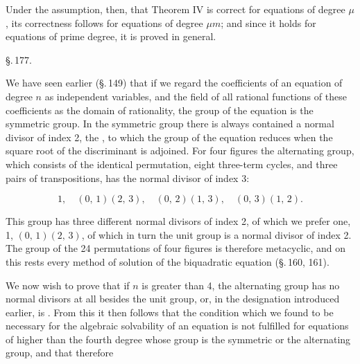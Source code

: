 
Under the assumption, then, that Theorem IV is correct for equations of degree $\mu$, its correctness follows for equations of degree $\mu m$; and since it holds for equations of prime degree, it is proved in general.

\begin{center}
\S.\,177.

\end{center}

We have seen earlier (\S.\,149) that if we regard the coefficients of an equation of degree $n$ as independent variables, and the field of all rational functions of these coefficients as the domain of rationality, the  group of the equation is the symmetric group. In the symmetric group there is always contained a normal divisor of index 2, the , to which the group of the equation reduces when the square root of the discriminant is adjoined. For four figures the alternating group, which consists of the identical permutation, eight three-term cycles, and three pairs of transpositions, has the normal divisor of index 3:

\[
1, \quad (0,\,1)(2,\,3), \quad (0,\,2)(1,\,3), \quad (0,\,3)(1,\,2).
\]

This group has three different normal divisors of index 2, of which we prefer one, 1, $(0,\,1)(2,\,3)$, of which in turn the unit group is a normal divisor of index 2. The group of the 24 permutations of four figures is therefore metacyclic, and on this rests every method of solution of the biquadratic equation (\S.\,160, 161).

We now wish to prove that if $n$ is greater than 4, the alternating group has no normal divisors at all besides the unit group, or, in the designation introduced earlier, is . From this it then follows that the condition which we found to be necessary for the algebraic solvability of an equation is not fulfilled for equations of higher than the fourth degree whose group is the symmetric or the alternating group, and that therefore 
